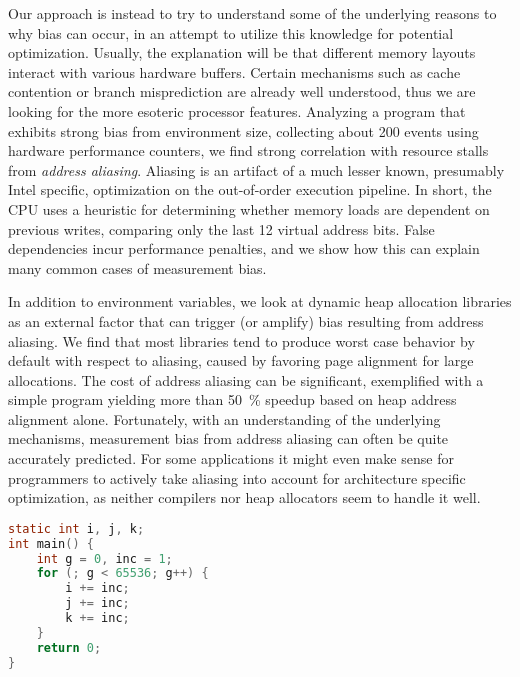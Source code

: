 \documentclass[a4paper,10pt,twocolumn,twoside]{article}
\begin{document}
Our approach is instead to try to understand some of the underlying reasons to why bias can occur, in an attempt to utilize this knowledge for potential optimization. %
Usually, the explanation will be that different memory layouts interact with various hardware buffers.
Certain mechanisms such as cache contention or branch misprediction are already well understood, thus we are looking for the more esoteric processor features.
Analyzing a program that exhibits strong bias from environment size, collecting about 200 events using hardware performance counters, we find strong correlation with resource stalls from \emph{address aliasing}.
Aliasing is an artifact of a much lesser known, presumably Intel specific, optimization on the out-of-order execution pipeline.
In short, the CPU uses a heuristic for determining whether memory loads are dependent on previous writes, comparing only the last 12 virtual address bits.
False dependencies incur performance penalties, and we show how this can explain many common cases of measurement bias.

In addition to environment variables, we look at dynamic heap allocation libraries as an external factor that can trigger (or amplify) bias resulting from address aliasing.
We find that most libraries tend to produce worst case behavior by default with respect to aliasing, caused by favoring page alignment for large allocations.
The cost of address aliasing can be significant, exemplified with a simple program yielding more than 50~\% speedup based on heap address alignment alone.
Fortunately, with an understanding of the underlying mechanisms, measurement bias from address aliasing can often be quite accurately predicted.
For some applications it might even make sense for programmers to actively take aliasing into account for architecture specific optimization, as neither compilers nor heap allocators seem to handle it well.

\begin{lstlisting}[float=t, language=C, caption={Micro-kernel presented by Mytkowitz et al~\cite{Mytkowicz:2009:WrongData}, succeptible to bias from variations to system environment variables.}, label={lst:loopkernel}, frame=lines]
static int i, j, k;
int main() {
    int g = 0, inc = 1;
    for (; g < 65536; g++) {
        i += inc;
        j += inc;
        k += inc; 
    }
    return 0;
}
\end{lstlisting}
\end{document}
